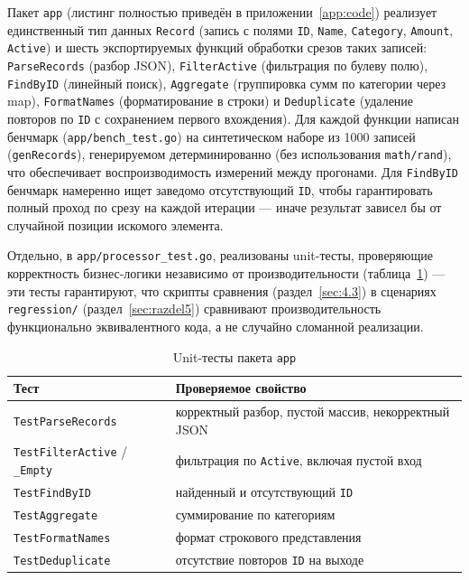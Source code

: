 \documentclass[12pt,a4paper]{article}
\numberwithin{equation}{section}
\begin{document}
Пакет \texttt{app} (листинг полностью приведён в приложении~\ref{app:code})
реализует единственный тип данных \texttt{Record} (запись с полями
\texttt{ID}, \texttt{Name}, \texttt{Category}, \texttt{Amount}, \texttt{Active})
и шесть экспортируемых функций обработки срезов таких записей:
\texttt{ParseRecords} (разбор JSON), \texttt{FilterActive} (фильтрация по
булеву полю), \texttt{FindByID} (линейный поиск), \texttt{Aggregate}
(группировка сумм по категории через map), \texttt{FormatNames}
(форматирование в строки) и \texttt{Deduplicate} (удаление повторов по
\texttt{ID} с сохранением первого вхождения). Для каждой функции написан
бенчмарк (\texttt{app/\allowbreak bench\_test.go}) на синтетическом наборе из 1000
записей (\texttt{genRecords}), генерируемом детерминированно (без
использования \texttt{math/\allowbreak rand}), что обеспечивает воспроизводимость
измерений между прогонами. Для \texttt{FindByID} бенчмарк намеренно ищет
заведомо отсутствующий \texttt{ID}, чтобы гарантировать полный проход по
срезу на каждой итерации — иначе результат зависел бы от случайной позиции
искомого элемента.

Отдельно, в \texttt{app/\allowbreak processor\_test.go}, реализованы unit-тесты,
проверяющие корректность бизнес-логики независимо от производительности
(таблица~\ref{tab:4.1}) — эти тесты гарантируют, что скрипты сравнения
(раздел~\ref{sec:4.3}) в сценариях \texttt{regression/\allowbreak *}
(раздел~\ref{sec:razdel5}) сравнивают производительность функционально
эквивалентного кода, а не случайно сломанной реализации.

\begin{table}[htbp]
\caption{Unit-тесты пакета \texttt{app}}
\label{tab:4.1}
\centering
\begin{tabular}{ll}
\toprule
Тест & Проверяемое свойство \\
\midrule
\texttt{TestParseRecords} & корректный разбор, пустой массив, некорректный JSON \\
\texttt{TestFilterActive} / \texttt{\_Empty} & фильтрация по \texttt{Active}, включая пустой вход \\
\texttt{TestFindByID} & найденный и отсутствующий \texttt{ID} \\
\texttt{TestAggregate} & суммирование по категориям \\
\texttt{TestFormatNames} & формат строкового представления \\
\texttt{TestDeduplicate} & отсутствие повторов \texttt{ID} на выходе \\
\bottomrule
\end{tabular}
\end{table}
\end{document}
